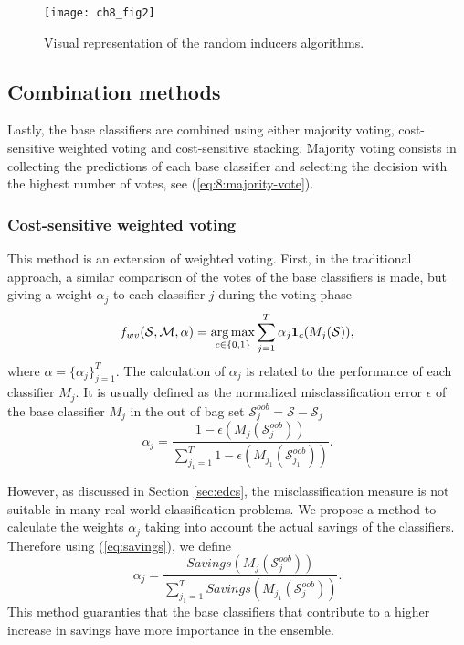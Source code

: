 {\begin{figure}[t!]
\texttt{[image: ch8\_fig2]}
\caption{Visual representation of the random inducers algorithms.}
\label{fig:8:2}
\end{figure} 


\subsection{Combination methods}
  Lastly, the base classifiers are combined using either majority voting, cost-sensitive weighted 
  voting and cost-sensitive stacking. Majority voting consists in collecting the predictions of 
  each base classifier and selecting the decision with the highest number of votes, see 
  (\ref{eq:8:majority-vote}).

  \subsubsection{Cost-sensitive weighted voting}

  This method is an extension of weighted voting. First, in the traditional approach, a 
  similar comparison of the votes of the base classifiers is made, but giving a weight $\alpha_j$ 
  to each classifier $j$ during the voting phase \citep{Zhou2012}
  \begin{align} \label{eq:8:weighted-majority-vote}
    f_{wv}(\mathcal{S},\mathcal{M}, \alpha)
    =\operatorname*{arg\,max}_{c \in \{0,1\}} \sum_{j=1}^T \alpha_j \mathbf{1}_c(M_j(\mathcal{S})),
  \end{align}
  where $\alpha=\{\alpha_j\}_{j=1}^T$.
  The calculation of $\alpha_j$ is related to the performance of each classifier $M_j$.
  It is usually defined as the normalized misclassification error   $\epsilon$ of the base 
  classifier $M_j$  in the out of bag set   $\mathcal{S}_j^{oob}=\mathcal{S}-\mathcal{S}_j$
  \begin{equation}
    \alpha_j=\frac{1-\epsilon(M_j(\mathcal{S}_j^{oob}))}{\sum_{j_1=1}^T 
    1-\epsilon(M_{j_1}(\mathcal{S}_{j_1}^{oob}))}.
  \end{equation}

  However, as discussed in Section \ref{sec:edcs}, the misclassification measure is not suitable in 
  many real-world classification problems. We propose a method to calculate the weights $\alpha_j$ 
  taking into account the actual savings of the classifiers. Therefore using (\ref{eq:savings}), we 
  define
  \begin{equation}
    \alpha_j=\frac{Savings(M_j(\mathcal{S}_j^{oob}))}
    {\sum_{j_1=1}^T Savings(M_{j_1}(\mathcal{S}_j^{oob}))}.
  \end{equation}
  This method guaranties that the base classifiers that contribute to a higher increase in savings 
  have more importance in the ensemble.
  
}
